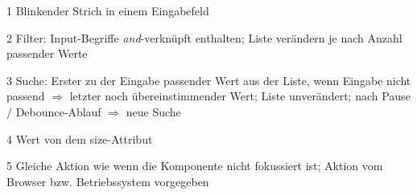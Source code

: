 \begin{table}[!htb]
\begin{adjustbox}{max width=\textwidth}
\begin{threeparttable}
\begin{tablenotes}
                \scriptsize
                \item[1] Blinkender Strich in einem Eingabefeld
                \item[2] Filter: Input-Begriffe \emph{and}-verknüpft enthalten; 
                                Liste verändern je nach Anzahl passender Werte
                \item[3] Suche: Erster zu der Eingabe passender Wert aus der Liste, wenn Eingabe nicht passend $\Rightarrow$ letzter noch übereinstimmender Wert; 
                                Liste unverändert; nach Pause / Debounce-Ablauf $\Rightarrow$ neue Suche
                \item[4] Wert von dem size-Attribut
                \item[5] Gleiche Aktion wie wenn die Komponente nicht fokussiert ist; Aktion vom Browser bzw. Betriebssystem vorgegeben
            \end{tablenotes}
        \end{threeparttable}
    \end{adjustbox}
\end{table}
